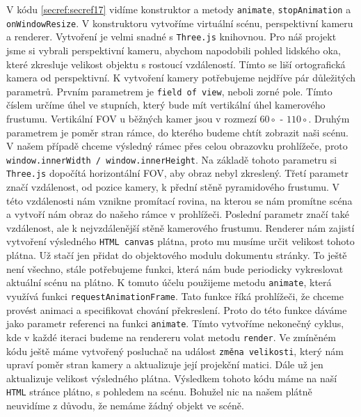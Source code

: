 \documentclass[czech,bachelor,dept420,male,cpdeclaration]{diploma}
\begin{document}
\begin{minipage}{\linewidth} 
 
\end{minipage} 
V kódu \ref{secref:secref17} vidíme konstruktor a metody \texttt{animate}, \texttt{stopAnimation} a \texttt{onWindowResize}. V konstruktoru vytvoříme virtuální scénu, perspektivní kameru a renderer. Vytvoření je velmi snadné s \texttt{Three.js} knihovnou. Pro náš projekt jsme si vybrali perspektivní kameru, abychom napodobili pohled lidského oka, které zkresluje velikost objektu s rostoucí vzdáleností. Tímto se liší ortografická kamera od perspektivní. K vytvoření kamery potřebujeme nejdříve pár důležitých parametrů. Prvním parametrem je \texttt{field of view}, neboli zorné pole. Tímto číslem určíme úhel ve stupních, který bude mít vertikální úhel kamerového frustumu. Vertikální FOV u běžných kamer jsou v rozmezí $60\circ$ - $110\circ$. Druhým parametrem je poměr stran rámce, do kterého budeme chtít zobrazit naši scénu. V našem případě chceme výsledný rámec přes celou obrazovku prohlížeče, proto \texttt{window.innerWidth / window.innerHeight}. Na základě tohoto parametru si \texttt{Three.js} dopočítá horizontální FOV, aby obraz nebyl zkreslený. Třetí parametr značí vzdálenost, od pozice kamery, k přední stěně pyramidového frustumu. V této vzdálenosti nám vznikne promítací rovina, na kterou se nám promítne scéna a vytvoří nám obraz do našeho rámce v prohlížeči. Poslední parametr značí také vzdálenost, ale k nejvzdálenější stěně kamerového frustumu. Renderer nám zajistí vytvoření výsledného \texttt{HTML canvas} plátna, proto mu musíme určit velikost tohoto plátna. Už stačí jen přidat do objektového modulu dokumentu stránky. To ještě není všechno, stále potřebujeme funkci, která nám bude periodicky vykreslovat aktuální scénu na plátno. K tomuto účelu použijeme metodu \texttt{animate}, která využívá funkci \texttt{requestAnimationFrame}. Tato funkce říká prohlížeči, že chceme provést animaci a specifikovat chování překreslení. Proto do této funkce dáváme jako parametr referenci na funkci \texttt{animate}. Tímto vytvoříme nekonečný cyklus, kde v každé iteraci budeme na rendereru volat metodu \texttt{render}. Ve zmíněném kódu ještě máme vytvořený posluchač na událost \texttt{změna velikosti}, který nám upraví poměr stran kamery a aktualizuje její projekční matici. Dále už jen aktualizuje velikost výsledného plátna. Výsledkem tohoto kódu máme na naší \texttt{HTML} stránce plátno, s pohledem na scénu. Bohužel nic na našem plátně neuvidíme z důvodu, že nemáme žádný objekt ve scéně.
\end{document}
